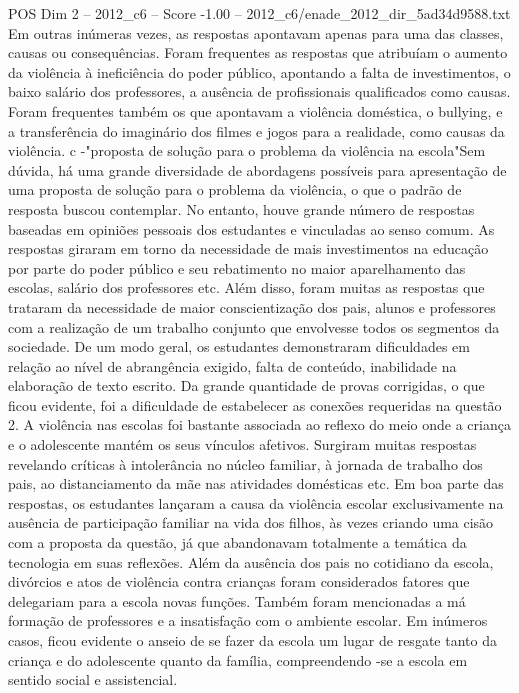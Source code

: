 \begin{textsample}{POS Dim 2 – 2012\_c6 – Score -1.00 – 2012\_c6/enade\_2012\_dir\_5ad34d9588.txt}
Em outras inúmeras vezes, as respostas apontavam apenas para uma das classes, causas ou consequências.
Foram frequentes as respostas que atribuíam o aumento da violência à ineficiência do poder público, apontando a falta de investimentos, o baixo salário dos professores, a ausência de profissionais qualificados como causas.
Foram frequentes também os que apontavam a violência doméstica, o bullying, e a transferência do imaginário dos filmes e jogos para a realidade, como causas da violência. c -"proposta de solução para o problema da violência na escola"Sem dúvida, há uma grande diversidade de abordagens possíveis para apresentação de uma proposta de solução para o problema da violência, o que o padrão de resposta buscou contemplar.
No entanto, houve grande número de respostas baseadas em opiniões pessoais dos estudantes e vinculadas ao senso comum.
As respostas giraram em torno da necessidade de mais investimentos na educação por parte do poder público e seu rebatimento no maior aparelhamento das escolas, salário dos professores etc.
Além disso, foram muitas as respostas que trataram da necessidade de maior conscientização dos pais, alunos e professores com a realização de um trabalho conjunto que envolvesse todos os segmentos da sociedade.
De um modo geral, os estudantes demonstraram dificuldades em relação ao nível de abrangência exigido, falta de conteúdo, inabilidade na elaboração de texto escrito.
Da grande quantidade de provas corrigidas, o que ficou evidente, foi a dificuldade de estabelecer as conexões requeridas na questão 2.
A violência nas escolas foi bastante associada ao reflexo do meio onde a criança e o adolescente mantém os seus vínculos afetivos.
Surgiram muitas respostas revelando críticas à intolerância no núcleo familiar, à jornada de trabalho dos pais, ao distanciamento da mãe nas atividades domésticas etc.
Em boa parte das respostas, os estudantes lançaram a causa da violência escolar exclusivamente na ausência de participação familiar na vida dos filhos, às vezes criando uma cisão com a proposta da questão, já que abandonavam totalmente a temática da tecnologia em suas reflexões.
Além da ausência dos pais no cotidiano da escola, divórcios e atos de violência contra crianças foram considerados fatores que delegariam para a escola novas funções.
Também foram mencionadas a má formação de professores e a insatisfação com o ambiente escolar.
Em inúmeros casos, ficou evidente o anseio de se fazer da escola um lugar de resgate tanto da criança e do adolescente quanto da família, compreendendo -se a escola em sentido social e assistencial.

\end{textsample}
